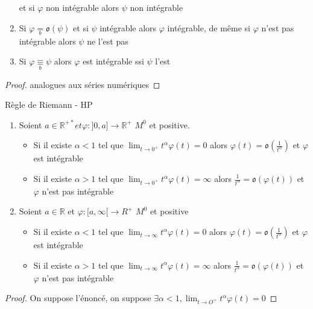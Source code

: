 \documentclass[11pt,hidelinks]{book}
\theoremstyle{mytheoremstyle}
\theoremstyle{mytheoremstyle}
\theoremstyle{mytheoremstyle}
\theoremstyle{mytheoremstyle}
\theoremstyle{mytheoremstyle}
\theoremstyle{mytheoremstyle}
\theoremstyle{mytheoremstyle}
\theoremstyle{mytheoremstyle}
\theoremstyle{myproblemstyle}
\def\mbb#1{\mathbb{#1}}
\def\mfk#1{\mathfrak{#1}}
\def\bR{\mbb{R}}
\newcommand{\func}[3]{#1\colon#2\to#3}
\newcommand{\parenth}[1]{\left(#1\right)}
\begin{document}
\begin{adjustwidth}{-2em}{-1em}
\begin{prop}
\begin{enumerate}
            et si $\varphi$ non intégrable alors $\psi$ non intégrable
            \item Si $\varphi \underset{b}{=} \mfk{o}(\psi)$ et si $\psi$ intégrable alors $\varphi$ intégrable, 
            de même si $\varphi$ n'est pas intégrable alors $\psi$ ne l'est pas 
            \item Si $\varphi \underset{b}{\equiv} \psi$ alors $\varphi$ est intégrable ssi $\psi$ l'est
        \end{enumerate}
        \begin{proof}
            analogues aux séries numériques
        \end{proof}
    \end{prop}
    \begin{theorem}{Règle de Riemann - HP}
        \begin{enumerate}
            \item Soient $a \in \bR^{+*} et \func{\varphi}{]0,a]}{\bR^+}$ $M^0$ et positive.
            \begin{itemize}
                \item Si il existe $\alpha < 1$ tel que $\lim_{t \to 0^+} t^{\alpha} \varphi(t) = 0$ alors $\varphi(t) = \mfk{o}\parenth{\frac{1}{t^{\alpha}}}$
                et $\varphi$ est intégrable
                \item Si il existe $\alpha > 1$ tel que $\lim_{t \to 0^+} t^{\alpha} \varphi(t) = \infty$ alors $\frac{1}{t^{\alpha}} = \mfk{o}(\varphi(t))$ et
                $\varphi$ n'est pas intégrable
            \end{itemize} 
            \item Soient $a \in \bR$ et $\func{\varphi}{[a,\infty[}{R^+}$ $M^0$ et positive 
            \begin{itemize}
                \item Si il existe $\alpha < 1$ tel que $\lim_{t \to \infty} t^{\alpha} \varphi(t) = 0$ alors $\varphi(t) = \mfk{o}\parenth{\frac{1}{t^{\alpha}}}$
                et $\varphi$ est intégrable
                \item Si il existe $\alpha > 1$ tel que $\lim_{t \to \infty} t^{\alpha} \varphi(t) = \infty$ alors $\frac{1}{t^{\alpha}} = \mfk{o}(\varphi(t))$ et
                $\varphi$ n'est pas intégrable
            \end{itemize}
        \end{enumerate}
        \begin{proof}
            On suppose l'énoncé, on suppose $\exists \alpha < 1, \lim_{t \to O^+} t^{\alpha} \varphi(t) = 0$

\end{proof}
\end{theorem}
\end{adjustwidth}
\end{document}
